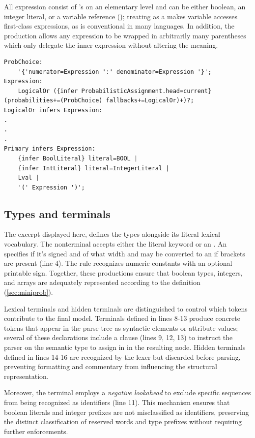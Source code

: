 All expression consist of 's on an elementary level and can be either boolean, an integer literal, or a variable reference (); treating  as a  makes variable accesses first-class expressions,
as is conventional in many languages. In addition, the production allows any expression to be wrapped in arbitrarily many parentheses which only delegate the inner expression without altering the meaning.

\begin{verbatim}
ProbChoice:
    '{'numerator=Expression ':' denominator=Expression '}';
Expression:
    LogicalOr ({infer ProbabilisticAssignment.head=current} (probabilities+=(ProbChoice) fallbacks+=LogicalOr)+)?;
LogicalOr infers Expression:
.
.
.
Primary infers Expression:
    {infer BoolLiteral} literal=BOOL | 
    {infer IntLiteral} literal=IntegerLiteral |
    Lval |
    '(' Expression ')';
\end{verbatim}

\subsection*{Types and terminals}

The excerpt displayed here, defines the types alongside its literal lexical vocabulary. The nonterminal  accepts either the literal keyword  or an . An  specifies if it's signed and of what width and may be converted to an  if brackets are present (line 4).
The  rule recognizes numeric constants with an optional printable sign. Together, these productions ensure that boolean types, integers, and arrays are adequately represented according to the  definition (\ref{sec:miniprob}).

Lexical terminals and hidden terminals are distinguished to control which tokens contribute to the final model. Terminals defined in lines 8-13 produce concrete tokens that appear in the parse tree as syntactic elements or attribute values; several of these declarations include a  clause (lines 9, 12, 13) to instruct the parser on the semantic type to assign in
in the resulting node. Hidden terminals defined in lines 14-16 are recognized by the lexer but discarded before parsing, preventing formatting and commentary from influencing the structural representation.

Moreover, the  terminal employs a \textit{negative lookahead} to exclude specific sequences from being recognized as identifiers (line 11). This mechanism ensures that boolean literals and integer prefixes are not misclassified as identifiers, preserving the distinct classification of reserved words and type prefixes without requiring further enforcements.

